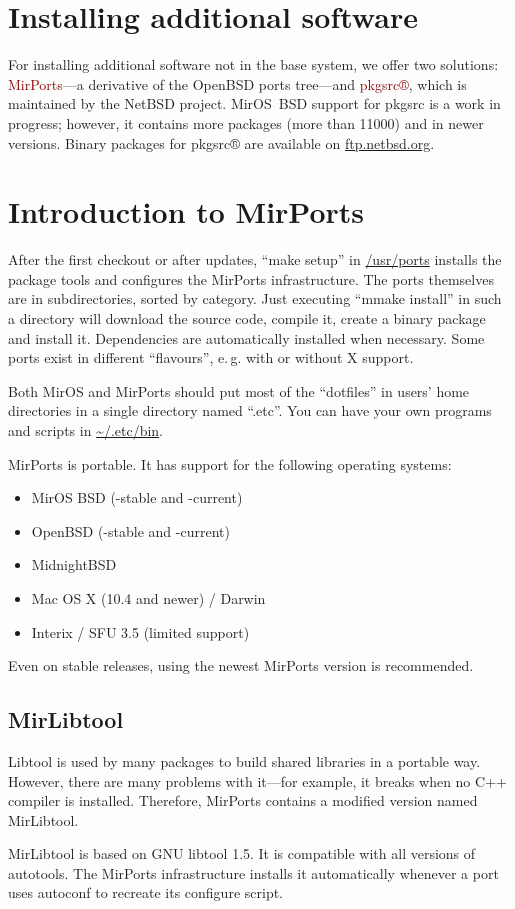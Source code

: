 \documentclass[a4paper,landscape,11pt,notumble]{leaflet}
\begin{document}
\section{Installing additional software}

For installing additional software not in the base system, we offer two solutions: 
\textcolor{darkred}{MirPorts}---a derivative of the OpenBSD ports tree---and \textcolor{darkred}{pkgsrc®}, which is maintained by the NetBSD project.
MirOS~BSD support for pkgsrc is a work in progress; however, it contains more packages (more than 11000) and in newer versions.
Binary packages for pkgsrc® are available on \url{ftp.netbsd.org}.

\newpage

\section{Introduction to MirPorts}

After the first checkout or after updates, ``make setup'' in \url{/usr/ports} installs the package tools and configures the MirPorts infrastructure. The ports themselves are in subdirectories, sorted by category. Just executing ``mmake install'' in such a directory will download the source code, compile it, create a binary package and install it. Dependencies are automatically installed when necessary. Some ports exist in different ``flavours'', e.\,g. with or without X support.

Both MirOS and MirPorts should put most of the ``dotfiles'' in users' home directories in a single directory named ``.etc''. You can have your own programs and scripts in \url{~/.etc/bin}.

MirPorts is portable. It has support for the following operating systems:

\begin{itemize}
\item MirOS BSD (-stable and -current)
\item OpenBSD (-stable and -current)
\item MidnightBSD
\item Mac OS X (10.4 and newer) / Darwin
\item Interix / SFU 3.5 (limited support)
\end{itemize}

\noindent
Even on stable releases, using the newest MirPorts version is recommended. 

\subsection{MirLibtool}

Libtool is used by many packages to build shared libraries in  a portable way. However, there are many problems with it—for example, it breaks when no C++ compiler is installed. Therefore, MirPorts contains a modified version named MirLibtool.

MirLibtool is based on GNU libtool 1.5. It is compatible with all versions of autotools. The MirPorts infrastructure installs it automatically whenever a port uses autoconf to recreate its configure script.
\end{document}
